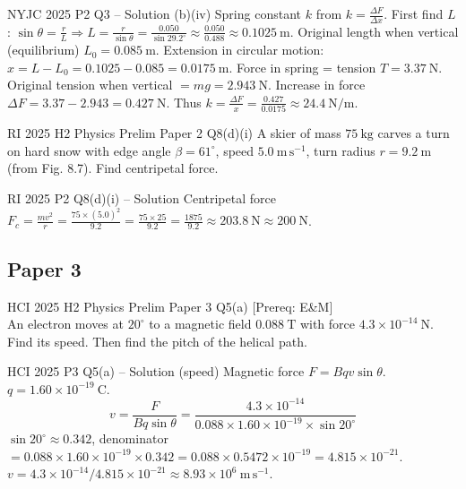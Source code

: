 \documentclass[11pt]{beamer}
\begin{document}
\begin{frame}[shrink=15]{NYJC 2025 P2 Q3 – Solution (b)(iv)}
Spring constant $k$ from $k = \frac{\Delta F}{\Delta x}$.
First find $L$: $\sin\theta = \frac{r}{L} \Rightarrow L = \frac{r}{\sin\theta} = \frac{0.050}{\sin29.2^\circ} \approx \frac{0.050}{0.488} \approx 0.1025\ \mathrm{m}$.
Original length when vertical (equilibrium) $L_0 = 0.085\ \mathrm{m}$.
Extension in circular motion: $x = L - L_0 = 0.1025 - 0.085 = 0.0175\ \mathrm{m}$.
Force in spring = tension $T = 3.37\ \mathrm{N}$. Original tension when vertical $= mg = 2.943\ \mathrm{N}$.
Increase in force $\Delta F = 3.37 - 2.943 = 0.427\ \mathrm{N}$.
Thus $k = \frac{\Delta F}{x} = \frac{0.427}{0.0175} \approx 24.4\ \mathrm{N/m}$.
\end{frame}

\begin{frame}[shrink=15]{RI 2025 H2 Physics Prelim Paper 2 Q8(d)(i)}
A skier of mass $75\ \mathrm{kg}$ carves a turn on hard snow with edge angle $\beta = 61^\circ$, speed $5.0\ \mathrm{m\,s^{-1}}$, turn radius $r = 9.2\ \mathrm{m}$ (from Fig. 8.7). Find centripetal force.
\end{frame}

\begin{frame}{RI 2025 P2 Q8(d)(i) – Solution}
Centripetal force $F_c = \frac{mv^2}{r} = \frac{75\times(5.0)^2}{9.2} = \frac{75\times25}{9.2} = \frac{1875}{9.2} \approx 203.8\ \mathrm{N} \approx 200\ \mathrm{N}$.
\end{frame}

\subsection{Paper 3}

\begin{frame}[shrink=15]{HCI 2025 H2 Physics Prelim Paper 3 Q5(a)}
[Prereq: E\&M]\\
An electron moves at $20^\circ$ to a magnetic field $0.088\ \mathrm{T}$ with force $4.3\times10^{-14}\ \mathrm{N}$. Find its speed. Then find the pitch of the helical path.
\end{frame}

\begin{frame}{HCI 2025 P3 Q5(a) – Solution (speed)}
Magnetic force $F = B q v \sin\theta$. $q = 1.60\times10^{-19}\ \mathrm{C}$.
\[ v = \frac{F}{B q \sin\theta} = \frac{4.3\times10^{-14}}{0.088 \times 1.60\times10^{-19} \times \sin20^\circ} \]
$\sin20^\circ \approx 0.342$, denominator $= 0.088\times1.60\times10^{-19}\times0.342 = 0.088\times0.5472\times10^{-19} = 4.815\times10^{-21}$.
$v = 4.3\times10^{-14} / 4.815\times10^{-21} \approx 8.93\times10^{6}\ \mathrm{m\,s^{-1}}$.
\end{frame}
\end{document}
